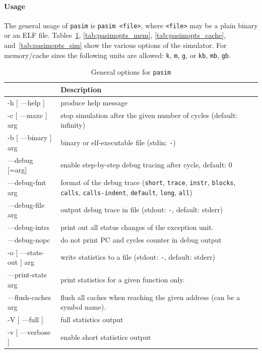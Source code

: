 \documentclass[a4paper,fontsize=10pt,twoside,DIV15,BCOR12mm,headinclude=true,footinclude=false,pagesize,bibtotoc]{scrbook}
\begin{document}
\paragraph{Usage} The general usage of \texttt{pasim} is \texttt{pasim
  <file>}, where \texttt{<file>} may be a plain binary or an ELF
file. Tables~\ref{tab:pasimopts_gen}, \ref{tab:pasimopts_mem},
\ref{tab:pasimopts_cache}, and~\ref{tab:pasimopts_sim} show the
various options of the simulator. For memory/cache sizes the following
units are allowed: \texttt{k}, \texttt{m}, \texttt{g}, or \texttt{kb},
\texttt{mb}, \texttt{gb}.

\begin{table}[b!]
  \centering
  \caption{General options for \texttt{pasim}}
  \label{tab:pasimopts_gen}
  \begin{tabular}{>{\ttfamily}l<{}p{}}
    \toprule
    \multicolumn{1}{l}{Option} & Description \\
    \midrule
    -h [ ---help ]       & produce help message \\
    -c [ ---maxc ] arg   & stop simulation after the given number of cycles (default: infinity) \\
    -b [ ---binary ] arg & binary or elf-executable file (stdin: \texttt{-}) \\
    ---debug [=arg]      & enable step-by-step debug tracing after cycle, default: 0 \\
    ---debug-fmt arg     & format of the debug trace (\texttt{short}, \texttt{trace}, \texttt{instr}, \texttt{blocks}, \texttt{calls}, \texttt{calls-indent}, \texttt{default}, \texttt{long}, \texttt{all}) \\
    ---debug-file arg    & output debug trace in file (stdout: \texttt{-}, default: stderr) \\
    ---debug-intrs       & print out all status changes of the exception unit. \\
    ---debug-nopc        & do not print PC and cycles counter in debug output \\
    -o [ ---stats-out ] arg & write statistics to a file (stdout: \texttt{-}, default: stderr) \\
    ---print-stats arg   & print statistics for a given function only. \\
    ---flush-caches arg  & flush all caches when reaching the given address (can be a symbol name). \\
    -V [ ---full ]       & full statistics output \\
    -v [ ---verbose ]    & enable short statistics output \\
    \bottomrule
  \end{tabular}
\end{table}
\end{document}
